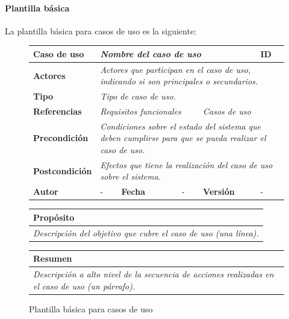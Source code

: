 \documentclass[12pt,spanish]{article}
\begin{document}
\paragraph{Plantilla básica}
La plantilla básica para casos de uso es la siguiente: 
\begin{figure}[H]
\centering
\begin{tabular}{|m{3cm}|m{2.65cm}|m{2cm}|m{2cm}|m{2cm}|m{1cm}|}
\hline
\textbf{Caso de uso} &  \multicolumn{4}{m{9.65cm}|}{\textit{Nombre del caso de uso}} &  \cellcolor{gray!40}ID \\
\hline
\textbf{Actores} & \multicolumn{5}{m{9.65cm}|}{\textit{Actores que participan en el caso de uso, indicando si son principales o secundarios.}} \\
\hline
\textbf{Tipo} & \multicolumn{5}{m{9.65cm}|}{\textit{Tipo de caso de uso.}} \\
\hline
\textbf{Referencias} &\multicolumn{3}{m{4.77cm}|}{\textit{Requisitos funcionales}} & \multicolumn{2}{m{4.77cm}|}{\textit{Casos de uso}} \\
\hline
\textbf{Precondición} & \multicolumn{5}{m{9.65cm}|}{\textit{Condiciones sobre el estado del sistema que deben cumplirse para que se pueda realizar el caso de uso.}} \\
\hline
\textbf{Postcondición} & \multicolumn{5}{m{9.65cm}|}{\textit{Efectos que tiene la realización del caso de uso sobre el sistema.}} \\
\hline
\textbf{Autor} & - & \textbf{Fecha} & - & \textbf{Versión} & - \\
\hline
\end{tabular}

\vspace{1cm}

\begin{tabular}{|m{16.2cm}|}
\hline
\textbf{Propósito} \\
\hline
\textit{Descripción del objetivo que cubre el caso de uso (una línea).} \\
\hline
\end{tabular}

\vspace{1cm}

\begin{tabular}{|m{16.2cm}|}
\hline
\textbf{Resumen} \\
\hline
\textit{Descripción a alto nivel de la secuencia de acciones realizadas en el caso de uso (un párrafo).} \\
\hline
\end{tabular}

\caption{Plantilla básica para casos de uso}

\end{figure}
\end{document}

